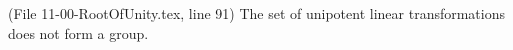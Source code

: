 
\def\Erratum#1#2#3{(File #1, line #2) #3}


\Erratum{11-00-RootOfUnity.tex}{91}{The set of unipotent linear
transformations does not form a group.}
